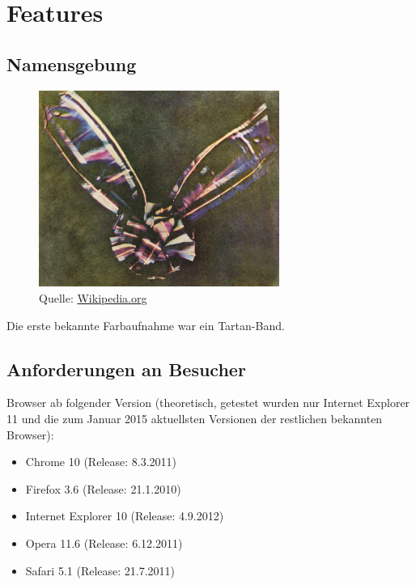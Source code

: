 \chapter{Features}

\section{Namensgebung}
\begin{figure}[h]
  \centering
  \includegraphics[width=0.7\textwidth]{images/tartan_band.jpg}
  \caption{Quelle: \url{Wikipedia.org}}
\end{figure}
Die erste bekannte Farbaufnahme war ein Tartan-Band.

\section{Anforderungen an Besucher}\label{besAnforderungen}
Browser ab folgender Version (theoretisch, getestet wurden nur Internet Explorer 11 und die zum Januar 2015 aktuellsten Versionen der restlichen bekannten Browser):
\begin{itemize}
	\item Chrome 10 (Release: 8.3.2011)
	\item Firefox 3.6 (Release: 21.1.2010)
	\item Internet Explorer 10 (Release: 4.9.2012)
	\item Opera 11.6 (Release: 6.12.2011)
	\item Safari 5.1 (Release: 21.7.2011)
\end{itemize}
